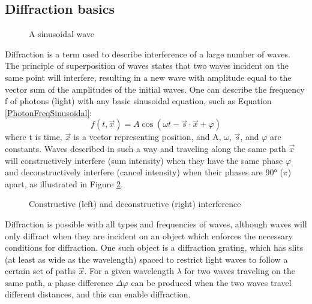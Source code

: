 \subsection{Diffraction basics}
\begin{figure}[htbp]
  \centering
  
  \caption{A sinusoidal wave}
  \label{basicwave}
\end{figure}
Diffraction is a term used to describe interference of a large number of waves. The principle of superposition of waves states that two waves incident on the same point will interfere, resulting in a new wave with amplitude equal to the vector sum of the amplitudes of the initial waves. One can describe the frequency f of photons (light) with any basic sinusoidal equation, such as Equation \ref{PhotonFreqSinusoidal}:
\begin{equation}
     f(t,\vec{x})=A\cos{(\omega t-\vec{s}\cdot\vec{x}+\varphi)}
    \label{PhotonFreqSinusoidal}
\end{equation}
where t is time, $\vec{x}$ is a vector representing position, and A, $\omega$, $\vec{s}$, and $\varphi$ are constants. Waves described in such a way and traveling along the same path $\vec{x}$ will constructively interfere (sum intensity) when they have the same phase $\varphi$ and deconstructively interfere (cancel intensity) when their phases are \ang{90} ($\pi$) apart, as illustrated in Figure \ref{interference}.
\begin{figure}[htbp]
  \centering
  
  \caption{Constructive (left) and deconstructive (right) interference}
  \label{interference}
\end{figure}
Diffraction is possible with all types and frequencies of waves, although waves will only diffract when they are incident on an object which enforces the necessary conditions for diffraction. One such object is a diffraction grating, which has slits (at least as wide as the wavelength) spaced to restrict light waves to follow a certain set of paths $\vec{x}$. For a given wavelength $\lambda$ for two waves traveling on the same path, a phase difference $\Delta\varphi$ can be produced when the two waves travel different distances, and this can enable diffraction.

